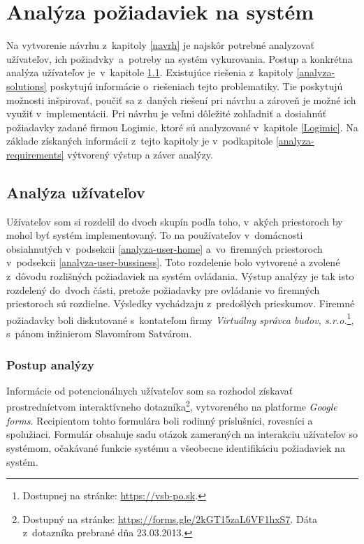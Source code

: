 \chapter{Analýza požiadaviek na systém}\label{anal}
Na vytvorenie návrhu z~kapitoly \ref{navrh} je najskôr potrebné analyzovať užívateľov, ich požiadvky~a~potreby na systém vykurovania. 
Postup a konkrétna analýza užívateľov je~v~kapitole \ref{analyza-user}. 
Existujúce riešenia z~kapitoly \ref{analyza-solutions} poskytujú informácie o~riešeniach tejto problematiky. 
Tie poskytujú možnosti inšpirovať, poučiť sa z~daných riešení pri návrhu a zároveň je možné ich využiť v~implementácii. 
Pri návrhu je veľmi dôležité zohľadniť a dosiahnúť požiadavky zadané firmou Logimic, ktoré sú analyzované v~kapitole \ref{Logimic}. 
Na základe získaných informácii z~tejto kapitoly je v~podkapitole \ref{analyza-requirements} výtvorený výstup a záver analýzy.

\section{Analýza užívateľov}\label{analyza-user}
Užívateľov som si rozdelil do dvoch skupín podľa toho, v~akých priestoroch by mohol byť systém implementovaný. 
To na používateľov v~domácnosti obsiahnutých v~podsekcii \ref{analyza-user-home} a~vo~firemných priestoroch v~podsekcii \ref{analyza-user-bussiness}. 
Toto rozdelenie bolo vytvorené a zvolené z~dôvodu rozlišných požiadaviek na systém ovládania. 
Výstup analýzy je tak isto rozdelený do~dvoch části, pretože požiadavky pre ovládanie vo firemných priestoroch sú rozdielne. Výsledky vychádzaju z~predošlých prieskumov. 
Firemné požiadavky boli diskutované s~kontateľom firmy \emph{Virtuálny správca budov, s.r.o.}\footnote{Dostupnej na stránke: \url{https://vsb-po.sk}.}, s~pánom inžinierom Slavomírom Satvárom.

\subsection*{Postup analýzy}
Informácie od potencionálnych užívateľov som sa rozhodol získavať prostredníctvom interaktívneho dotazníka\footnote{Dostupný na stránke: \url{https://forms.gle/2kGT15zaL6VF1hxS7}. 
Dáta z~dotazníka prebrané dňa 23.03.2013.}, vytvoreného na platforme \emph{Google forms}. 
Recipientom tohto formulára boli rodinný príslušníci, rovesníci a spolužiaci. 
Formulár obsahuje sadu otázok zameraných na interakciu užívateľov so systémom, očakávané funkcie systému a všeobecne identifikáciu požiadaviek na systém.

